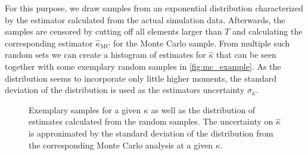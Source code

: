 For this purpose, we draw samples from an exponential distribution characterized by the estimator calculated from the actual simulation data. Afterwards, the samples are censored by cutting off all elements larger than $T$ and calculating the corresponding estimator $\hat{\kappa}_{\text{MC}}$ for the Monte Carlo sample. From multiple such random sets we can create a histogram of estimates for $\hat{\kappa}$ that can be seen together with some exemplary random samples in \autoref{fig:mc_example}. As the distribution seems to incorporate only little higher moments, the standard deviation of the distribution is used as the estimators uncertainty $\sigma_{\hat{\kappa}}$.\\

\begin{figure}[ht]
 \hspace{0.5cm}
\caption[Monte Carlo uncertainty estimation example]{Exemplary samples for a given $\kappa$ as well as the distribution of estimates calculated from the random samples. The uncertainty on $\hat{\kappa}$ is approximated by the standard deviation of the distribution from the corresponding Monte Carlo analysis at a given $\kappa$.}
\label{fig:mc_example}
\end{figure}

